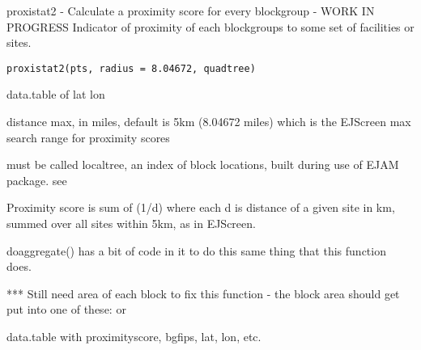 \documentclass[a4paper]{book}
\begin{document}
%
\begin{Description}\relax
proxistat2 - Calculate a proximity score for every blockgroup - WORK IN PROGRESS
Indicator of proximity of each blockgroups to some set of facilities or sites.
\end{Description}
%
\begin{Usage}
\begin{verbatim}
proxistat2(pts, radius = 8.04672, quadtree)
\end{verbatim}
\end{Usage}
%
\begin{Arguments}
\begin{ldescription}
\item[\code{pts}] data.table of lat lon

\item[\code{radius}] distance max, in miles, default is 5km (8.04672 miles)
which is the EJScreen max search range for proximity scores

\item[\code{quadtree}] must be called localtree, an index of block locations,
built during use of EJAM package. see 
\end{ldescription}
\end{Arguments}
%
\begin{Details}\relax
Proximity score is sum of (1/d) where each d is distance of a given site in km,
summed over all sites within 5km, as in EJScreen.

doaggregate() has a bit of code in it to do this same thing that this function does.

*** Still need area of each block to fix this function -
the block area should get put into one of these:
 or 
\end{Details}
%
\begin{Value}
data.table with proximityscore, bgfips, lat, lon, etc.
\end{Value}
%
\begin{Examples}
\end{Examples}
\end{document}
